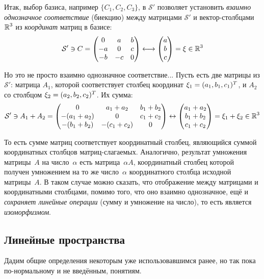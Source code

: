 \documentclass[a4paper,12pt]{article}
\newcommand{\Coso}{\mathcal S'}
\begin{document}
  Итак, выбор базиса, например $\{C_1, C_2, C_3\}$, в $\Coso$ позволяет установить \emph{взаимно однозначное соответствие} (биекцию) между матрицами $\Coso$ и вектор-столбцами $\operatorname{\mathbb R}^3$ из \emph{координат} матриц в базисе:
  \[
    \Coso \ni C = \begin{pmatrix}
       0 &  a & b\\
      -a &  0 & c\\
      -b & -c & 0
    \end{pmatrix} \longleftrightarrow \begin{pmatrix}
      a \\ b \\ c
    \end{pmatrix} = \xi \in \RR^3
  \]
  
  Но это не просто взаимно однозначное соответствие...
  Пусть есть две матрицы из $\Coso$: матрица $A_1$, которой соответствует столбец координат $\xi_1 \hm= (a_1, b_1, c_1)^T$, и $A_2$ со столбцом $\xi_2 \hm= (a_2, b_2, c_2)^T$.
  Их сумма:
  \[
    \Coso \ni A_1 + A_2 = \begin{pmatrix}
       0           &  a_1 + a_2   & b_1 + b_2\\
      -(a_1 + a_2) &  0           & c_1 + c_2\\
      -(b_1 + b_2) & -(c_1 + c_2) & 0
    \end{pmatrix} \leftrightarrow \begin{pmatrix}
      a_1 + a_2\\
      b_1 + b_2\\
      c_1 + c_2
    \end{pmatrix} = \xi_1 + \xi_2 \in \RR^3
  \]
  
  То есть сумме матриц соответствует координатный столбец, являющийся суммой координатных столбцов матриц-слагаемых.
  Аналогично, результат умножения матрицы~$A$ на число~$\alpha$ есть матрица~$\alpha A$, координатный столбец которой получен умножением на то же число~$\alpha$ координатного столбца исходной матрицы~$A$.
  В таком случае можно сказать, что отображение между матрицами и координатными столбцами, помимо того, что оно взаимно однозначное, ещё и \emph{сохраняет линейные операции} (сумму и умножение на число), то есть является \emph{изоморфизмом}.
  
  
  \subsection{Линейные пространства}
  
  Дадим общие определения некоторым уже использовавшимся ранее, но так пока по-нормальному и не введённым, понятиям.
  
\end{document}
